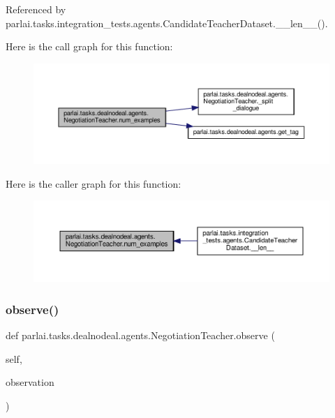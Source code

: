 Referenced by parlai.\+tasks.\+integration\+\_\+tests.\+agents.\+Candidate\+Teacher\+Dataset.\+\_\+\+\_\+len\+\_\+\+\_\+().

Here is the call graph for this function\+:
\nopagebreak
\begin{figure}[H]
\begin{center}
\leavevmode
\includegraphics[width=350pt]{classparlai_1_1tasks_1_1dealnodeal_1_1agents_1_1NegotiationTeacher_a87d200e80614ec6ac4b7611d698f22f5_cgraph}
\end{center}
\end{figure}
Here is the caller graph for this function\+:
\nopagebreak
\begin{figure}[H]
\begin{center}
\leavevmode
\includegraphics[width=350pt]{classparlai_1_1tasks_1_1dealnodeal_1_1agents_1_1NegotiationTeacher_a87d200e80614ec6ac4b7611d698f22f5_icgraph}
\end{center}
\end{figure}
\mbox{\label{classparlai_1_1tasks_1_1dealnodeal_1_1agents_1_1NegotiationTeacher_aa1a512ed945c5fc33a90005b25ef817f}} 
\subsubsection{\texorpdfstring{observe()}{observe()}}
{\footnotesize\ttfamily def parlai.\+tasks.\+dealnodeal.\+agents.\+Negotiation\+Teacher.\+observe (\begin{DoxyParamCaption}\item[{}]{self,  }\item[{}]{observation }\end{DoxyParamCaption})}

